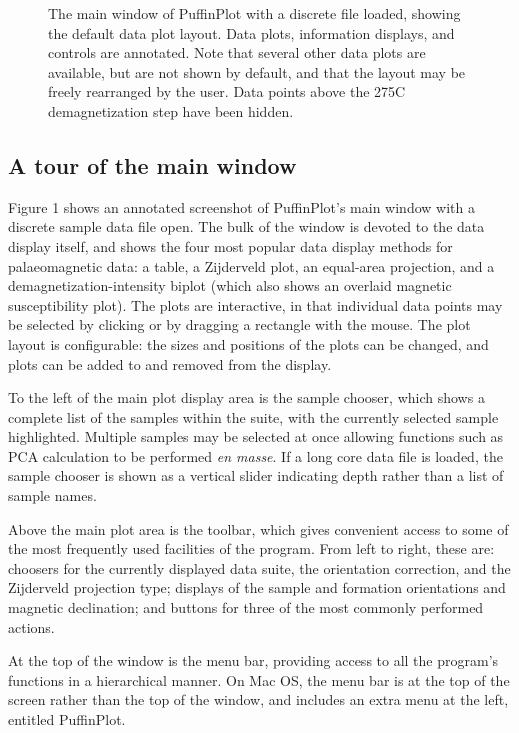 \documentclass[a4paper,british]{article}
\newcommand{\caps}[1]{\MakeTextUppercase{#1}} %
\begin{document}
\begin{figure}[htbp]
\fi
\caption{\label{fig:screenshot}The main window of PuffinPlot with a discrete
  file loaded, showing the default data plot layout. Data plots, information
  displays, and controls are annotated. Note that several other data plots
  are available, but are not shown by default, and that the layout may be
  freely rearranged by the user. Data points above the 275\textdegree C
  demagnetization step have been hidden.}
\end{figure}

\subsection{A tour of the main window}

Figure 1 shows an annotated screenshot of PuffinPlot's main window with
a discrete sample data file open. The bulk of the window is devoted to
the data display itself, and shows the four most popular data display
methods for palaeomagnetic data: a table, a Zijderveld plot, an
equal-area projection, and a demagnetization-intensity biplot (which
also shows an overlaid magnetic susceptibility plot). The plots are
interactive, in that individual data points may be selected by clicking
or by dragging a rectangle with the mouse. The plot layout is configurable:
the sizes and positions of the plots can be changed, and plots can be 
added to and removed from the display.

To the left of the main plot display area is the sample chooser, which shows
a complete list of the samples within the suite, with the currently selected
sample highlighted. Multiple samples may be selected at once allowing
functions such as \caps{pca} calculation to be performed \emph{en masse}. If
a long core data file is loaded, the sample chooser is shown as a vertical
slider indicating depth rather than a list of sample names.

Above the main plot area is the toolbar, which gives convenient access
to some of the most frequently used facilities of the program. From left
to right, these are: choosers for the currently displayed data suite,
the orientation correction, and the Zijderveld projection type; displays
of the sample and formation orientations and magnetic declination; and
buttons for three of the most commonly performed actions.

At the top of the window is the menu bar, providing access to all the
program's functions in a hierarchical manner. On Mac OS, the menu bar is
at the top of the screen rather than the top of the window, and includes
an extra menu at the left, entitled \textsf{PuffinPlot}.
\end{document}
